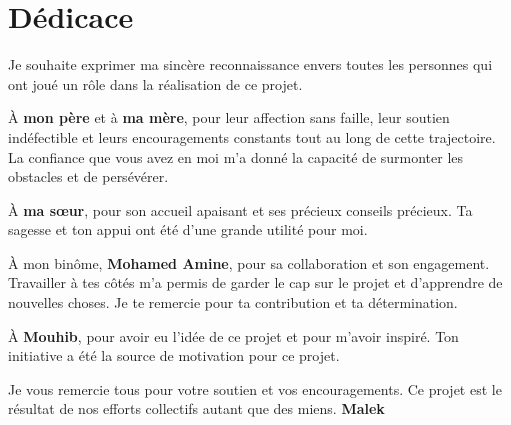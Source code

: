 \thispagestyle{empty}

\chapter*{Dédicace}

Je souhaite exprimer ma sincère reconnaissance envers toutes les personnes qui ont joué un rôle dans la réalisation de ce projet.
\vspace{1em}

À \textbf{mon père} et à \textbf{ma mère}, pour leur affection sans faille, leur soutien indéfectible et leurs encouragements constants tout au long de cette trajectoire. La confiance que vous avez en moi m'a donné la capacité de surmonter les obstacles et de persévérer.

À \textbf{ma sœur}, pour son accueil apaisant et ses précieux conseils précieux. Ta sagesse et ton appui ont été d'une grande utilité pour moi.

À mon binôme, \textbf{Mohamed Amine}, pour sa collaboration et son engagement. Travailler à tes côtés m’a permis de garder le cap sur le projet et d’apprendre de nouvelles choses. Je te remercie pour ta contribution et ta détermination.

À \textbf{Mouhib}, pour avoir eu l'idée de ce projet et pour m'avoir inspiré. Ton initiative a été la source de motivation pour ce projet.

\vspace{1em}
Je vous remercie tous pour votre soutien et vos encouragements. Ce projet est le résultat de nos efforts collectifs autant que des miens.
\vfill
\hfill \textbf{Malek}